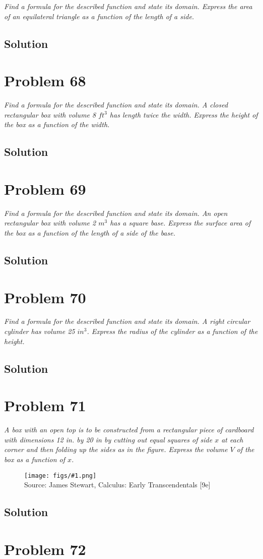 \documentclass[11pt]{article}
\newcommand{\soln}{\subsection*}
\newcommand{\qn}{\textit}
\newcommand{\imagesource}[1]{{\footnotesize Source: #1}}
\newcommand{\imgqn}[1]{
	\begin{figure}[h]
		\centering
		\texttt{[image: figs/\#1.png]}\\
		\imagesource{James Stewart, Calculus: Early Transcendentals [9e]}
	\end{figure}
}
\begin{document}
\qn{Find a formula for the described function and state its domain. Express the area of an equilateral triangle as a function of the length of a side.}

\soln{Solution}

\section*{Problem 68}

\qn{Find a formula for the described function and state its domain. A closed rectangular box with volume 8 $ft^3$ has length twice the width. Express the height of the box as a function of the width.}

\soln{Solution}

\section*{Problem 69}

\qn{Find a formula for the described function and state its domain. An open rectangular box with volume 2 $m^3$ has a square base. Express the surface area of the box as a function of the length of a side of the base.}

\soln{Solution}

\section*{Problem 70}

\qn{Find a formula for the described function and state its domain. A right circular cylinder has volume 25 $in^3$. Express the radius of the cylinder as a function of the height.}

\soln{Solution}

\section*{Problem 71}

\qn{A box with an open top is to be constructed from a rectangular piece of cardboard with dimensions 12 in. by 20 in by cutting out equal squares of side $x$ at each corner and then folding up the sides as in the figure. Express the volume $V$ of the box as a function of $x$.}

\imgqn{1.1.71}

\soln{Solution}

\section*{Problem 72}
\end{document}
